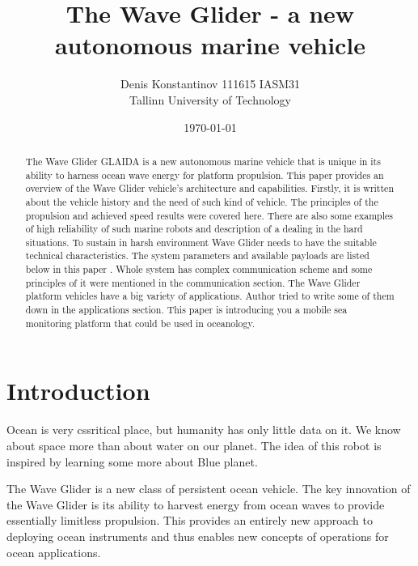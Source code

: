 
\title{The Wave Glider - a new autonomous marine vehicle}
\author{Denis Konstantinov 111615 IASM31 \\ Tallinn University of Technology} 
\date{\mydate\today}

\begin{abstract}
The Wave Glider GLAIDA is a new autonomous marine vehicle that is unique in its
ability to harness ocean wave energy for platform propulsion. This paper provides an
overview of the Wave Glider vehicle’s architecture and capabilities. Firstly, it is written about the vehicle history and the need of such kind of vehicle. The principles of the propulsion  and achieved speed  results  were covered here.  There are also some examples of high reliability of such marine robots  and description of a dealing in the hard situations. To sustain in harsh environment Wave Glider needs to have  the suitable  technical characteristics. The system parameters and available payloads are listed below in this paper .  Whole system has complex communication scheme and some principles of it were mentioned  in the communication section. The Wave Glider platform vehicles have  a big variety of applications.  Author tried to write some of them down in the applications section. This paper is introducing you a mobile sea monitoring platform that could be used in oceanology.
\end{abstract} 

\section{Introduction}


Ocean is very cssritical place, but humanity has only little data on it. We know
about space more than about water on our planet. The  idea of this robot is inspired by learning some more about Blue planet.


The Wave Glider is a new class of persistent ocean vehicle.  The key innovation of the Wave Glider is its ability to harvest energy from ocean waves to provide essentially limitless propulsion. This provides an entirely new approach to deploying ocean instruments and thus enables new concepts of operations for ocean applications.



